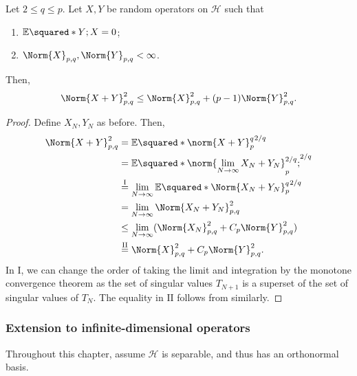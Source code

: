 \begin{corl}
    Let \( 2 \leq q \leq p \). Let \( X,Y \) be random operators on \( \mathcal{H} \) such that 
    \begin{enumerate}[1)]
      \item \(\mathbb{E}\squared*{Y;X}=0\);
      \item \( \Norm{X}_{p,q}, \Norm{Y}_{p,q} < \infty  \).
    \end{enumerate}
    Then, 
   \[ \Norm{X+Y}_{p,q}^{2} \leq \Norm{X}_{p,q}^{2}+ (p-1) \Norm{Y}_{p,q}^{2}. \]
\end{corl}

\begin{proof}
    Define \( X_N,Y_N \) as before. Then, 
    \begin{align*}
      \Norm{X+Y}_{p,q}^{2} &= \mathbb{E} \squared*{ \norm{X+Y}_{p}^{q}}^{2/q} \\
                           &= \mathbb{E} \squared*{ \norm{\lim_{N\to \infty} X_N + Y_N}_{p}^{2/q};}^{2/q} \\
                           &\overset{\text{I}}{=} \lim_{N \to \infty}\mathbb{E} \squared*{\Norm{X_N+Y_N}_{p}^{q}}^{2/q} \\
                           &= \lim_{N \to \infty} \Norm{X_N+Y_N}_{p,q}^{2} \\
                           &\leq \lim_{N \to \infty}(\Norm{X_N}_{p,q}^{2} + C_p \Norm{Y}_{p,q}^{2}) \\
                           &\overset{\text{II}}{=} \Norm{X}_{p,q}^{2} + C_p \Norm{Y}_{p,q}^{2}.
    \end{align*}
    In \( \mathrm{I} \), we can change the order of taking the limit and integration by the monotone convergence theorem as the set of singular values \( T_{N+1} \) is a superset of the set of singular values of \( T_N \). The equality in \( \mathrm{II} \) follows from similarly.  
\end{proof}



\subsubsection{Extension to infinite-dimensional operators}
Throughout this chapter, assume \( \mathcal{H} \) is separable, and thus has an orthonormal basis. 

